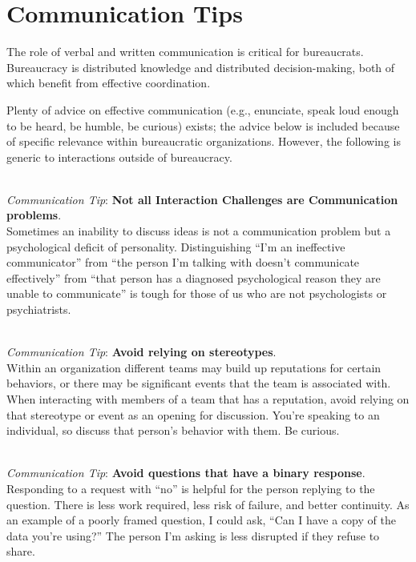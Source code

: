 \section{Communication Tips}

The role of verbal and written communication is critical for bureaucrats. Bureaucracy is distributed knowledge and distributed decision-making, both of which benefit from effective coordination. 


Plenty of advice on effective communication (e.g., enunciate, speak loud enough to be heard, be humble, be curious) exists; the advice below is included because of specific relevance within bureaucratic organizations. 
However, the following is generic to interactions outside of bureaucracy. 


\ \\
\textit{Communication Tip}: \textbf{Not all Interaction Challenges are Communication problems}.\\
Sometimes an inability to discuss ideas is not a communication problem but a psychological deficit of personality. Distinguishing ``I'm an ineffective communicator'' from ``the person I'm talking with doesn't communicate effectively'' from ``that person has a diagnosed psychological reason they are unable to communicate'' is tough for those of us who are not psychologists or psychiatrists. 


\ \\
\textit{Communication Tip}: \textbf{Avoid relying on stereotypes}. \\
Within an organization different teams may build up reputations for certain behaviors, or there may be significant events that the team is associated with. 
When interacting with members of a team that has a reputation, avoid relying on that stereotype or event as an opening for discussion. 
You're speaking to an individual, so discuss that person's behavior with them. Be curious.

\ \\
\textit{Communication Tip}: \textbf{Avoid questions that have a binary response\label{sec:yes-no-questions}}.\\
Responding to a request with ``no'' is helpful for the person replying to the question. There is less work required, less risk of failure, and better continuity. As an example of a poorly framed question, I could ask, ``Can I have a copy of the data you're using?'' The person I'm asking is less disrupted if they refuse to share. 

